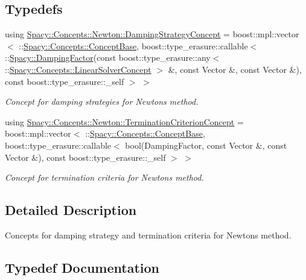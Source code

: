 \subsection*{Typedefs}
\begin{DoxyCompactItemize}
\item 
using \hyperlink{group__NewtonConceptGroup_ga8da917ba6de9c283c1509281956bb04a_ga8da917ba6de9c283c1509281956bb04a}{Spacy\+::\+Concepts\+::\+Newton\+::\+Damping\+Strategy\+Concept} = boost\+::mpl\+::vector$<$ \+::\hyperlink{group__ConceptGroup_ga63426675cc05ccce03ead56a4fa90d96_ga63426675cc05ccce03ead56a4fa90d96}{Spacy\+::\+Concepts\+::\+Concept\+Base}, boost\+::type\+\_\+erasure\+::callable$<$ \+::\hyperlink{classSpacy_1_1DampingFactor}{Spacy\+::\+Damping\+Factor}(const boost\+::type\+\_\+erasure\+::any$<$ \+::\hyperlink{group__ConceptGroup_gac7d6a94c7131c8613e2ab26fddeb50bd_gac7d6a94c7131c8613e2ab26fddeb50bd}{Spacy\+::\+Concepts\+::\+Linear\+Solver\+Concept} $>$ \&, const Vector \&, const Vector \&), const boost\+::type\+\_\+erasure\+::\+\_\+self $>$ $>$
\begin{DoxyCompactList}\small\item\em Concept for damping strategies for Newton\textquotesingle{}s method. \end{DoxyCompactList}\item 
using \hyperlink{group__NewtonConceptGroup_ga7d7604bea8b7c261d3179a7e95ffbe76_ga7d7604bea8b7c261d3179a7e95ffbe76}{Spacy\+::\+Concepts\+::\+Newton\+::\+Termination\+Criterion\+Concept} = boost\+::mpl\+::vector$<$ \+::\hyperlink{group__ConceptGroup_ga63426675cc05ccce03ead56a4fa90d96_ga63426675cc05ccce03ead56a4fa90d96}{Spacy\+::\+Concepts\+::\+Concept\+Base}, boost\+::type\+\_\+erasure\+::callable$<$ bool(Damping\+Factor, const Vector \&, const Vector \&), const boost\+::type\+\_\+erasure\+::\+\_\+self $>$ $>$
\begin{DoxyCompactList}\small\item\em Concept for termination criteria for Newton\textquotesingle{}s method. \end{DoxyCompactList}\end{DoxyCompactItemize}


\subsection{Detailed Description}
Concepts for damping strategy and termination criteria for Newton\textquotesingle{}s method. 



\subsection{Typedef Documentation}
\hypertarget{group__NewtonConceptGroup_ga8da917ba6de9c283c1509281956bb04a_ga8da917ba6de9c283c1509281956bb04a}{}
